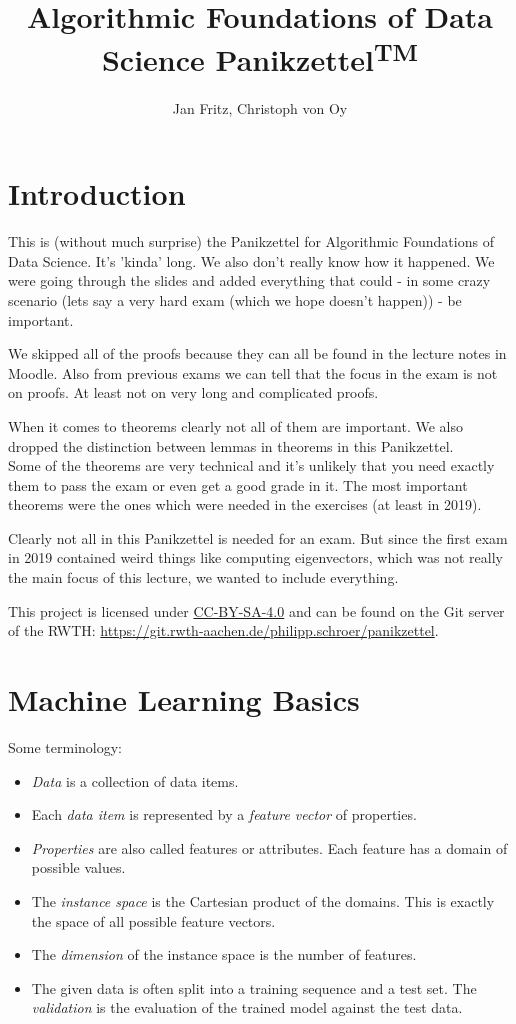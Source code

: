 \documentclass{panikzettel}
\title{Algorithmic Foundations of Data Science  Panikzettel\textsuperscript{\footnotesize TM}}
\author{Jan Fritz, Christoph von Oy}
\date{ } %
\begin{document}
\maketitle

\tableofcontents

\section{Introduction}
This is (without much surprise) the Panikzettel for Algorithmic Foundations of Data Science. It's 'kinda' long. We also don't really know how it happened. We were going through the slides and added everything that could - in some crazy scenario (lets say a very hard exam (which we hope doesn't happen)) - be important.

We skipped all of the proofs because they can all be found in the lecture notes in Moodle. Also from previous exams we can tell that the focus in the exam is not on proofs. At least not on very long and complicated proofs.

When it comes to theorems clearly not all of them are important. We also dropped the distinction between lemmas in theorems in this Panikzettel.\\
Some of the theorems are very technical and it's unlikely that you need exactly them to pass the exam or even get a good grade in it. The most important theorems were the ones which were needed in the exercises (at least in 2019).

Clearly not all in this Panikzettel is needed for an exam. But since the first exam in 2019 contained weird things like computing eigenvectors, which was not really the main focus of this lecture, we wanted to include everything.

This project is licensed under \href{https://creativecommons.org/licenses/by-sa/4.0/}{CC-BY-SA-4.0} and can be found on the Git server of the RWTH: \url{https://git.rwth-aachen.de/philipp.schroer/panikzettel}.

\section{Machine Learning Basics}
Some terminology:
\begin{itemize}
\item \emph{Data} is a collection of data items.
\item Each \emph{data item} is represented by a \emph{feature vector} of properties.
\item \emph{Properties} are also called features or attributes. Each feature has a domain of possible values.
\item The \emph{instance space} is the Cartesian product of the domains. This is exactly the space of all possible feature vectors.
\item The \emph{dimension} of the instance space is the number of features.
\item The given data is often split into a training sequence and a test set. The \emph{validation} is the evaluation of the trained model against the test data.
\end{itemize}
\end{document}

